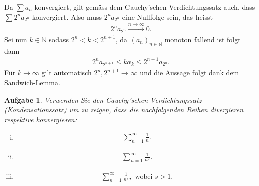 \documentclass[a4paper, 20]{exam}
\newtheorem{ex}{Aufgabe}
\begin{document}
\begin{solution} Da $\sum a_n$ konvergiert, gilt gemäss dem Cauchy'schen Verdichtungssatz auch, dass $\sum 2^n a_{2^n}$ konvergiert. Also muss $2^na_{2^n}$ eine Nullfolge sein, das heisst 
\begin{align*}
2^n a_{2^n} \xrightarrow{n \to \infty} 0. 
\end{align*}
Sei nun $k \in \mathbb{N}$ sodass $2^n < k <2^{n+1}$, da $(a_n)_{n \in \mathbb{N}}$ monoton fallend ist folgt dann
\begin{align*}
2^n a_{2^{n+1}} \leq k a_k \leq 2^{n+1} a_{2^n}.
\end{align*}
Für $k \to \infty$ gilt automatisch $2^n, 2^{n+1} \to \infty$ und die Aussage folgt dank dem Sandwich-Lemma. 
\end{solution}

\begin{ex} Verwenden Sie den Cauchy'schen Verdichtungssatz (Kondensationssatz) um zu zeigen, dass die nachfolgenden Reihen divergieren respektive konvergieren:
\begin{enumerate}[i)]
\item \begin{align*}
\sum_{n=1}^\infty \frac{1}{n}.
\end{align*}
\item \begin{align*}
\sum_{n=1}^\infty \frac{1}{n^2}.
\end{align*}

\item 
\begin{align*}
 \sum_{n=1}^\infty \frac{1}{n^s}, \text{ wobei } s >1. 
\end{align*}

\end{enumerate}

\end{ex}
\end{document}
